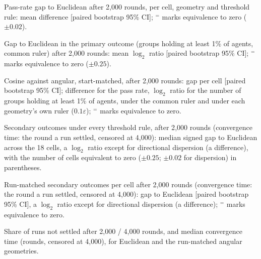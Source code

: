 \documentclass[11pt]{article}
\begin{document}
\begin{table}[h]
\centering\scriptsize
\caption{Pass-rate gap to Euclidean after 2{,}000 rounds, per cell, geometry and threshold rule: mean difference [paired bootstrap 95\% CI]; $^{=}$ marks equivalence to zero ($\pm0.02$).}
\label{tab:cells-pass}

\end{table}

\begin{table}[h]
\centering\scriptsize
\caption{Gap to Euclidean in the primary outcome (groups holding at least 1\% of agents, common ruler) after 2{,}000 rounds: mean $\log_2$ ratio [paired bootstrap 95\% CI]; $^{=}$ marks equivalence to zero ($\pm0.25$).}
\label{tab:cells-groups}

\end{table}

\begin{table}[h]
\centering\scriptsize
\caption{Cosine against angular, start-matched, after 2{,}000 rounds: gap per cell [paired bootstrap 95\% CI]; difference for the pass rate, $\log_2$ ratio for the number of groups holding at least 1\% of agents, under the common ruler and under each geometry's own ruler ($0.1\varepsilon$); $^{=}$ marks equivalence to zero.}
\label{tab:cos-ang}

\end{table}

\begin{table}[h]
\centering\scriptsize
\caption{Secondary outcomes under every threshold rule, after 2{,}000 rounds (convergence time: the round a run settled, censored at 4{,}000): median signed gap to Euclidean across the 18 cells, a $\log_2$ ratio except for directional dispersion (a difference), with the number of cells equivalent to zero ($\pm0.25$; $\pm0.02$ for dispersion) in parentheses.}
\label{tab:secondary}

\end{table}

\begin{table}[h]
\centering\scriptsize
\caption{Run-matched secondary outcomes per cell after 2{,}000 rounds (convergence time: the round a run settled, censored at 4{,}000): gap to Euclidean [paired bootstrap 95\% CI], a $\log_2$ ratio except for directional dispersion (a difference); $^{=}$ marks equivalence to zero.}
\label{tab:secondary-cells}

\end{table}

\begin{table}[h]
\centering\scriptsize
\caption{Share of runs not settled after 2{,}000 / 4{,}000 rounds, and median convergence time (rounds, censored at 4{,}000), for Euclidean and the run-matched angular geometries.}
\label{tab:settled}

\end{table}
\end{document}
